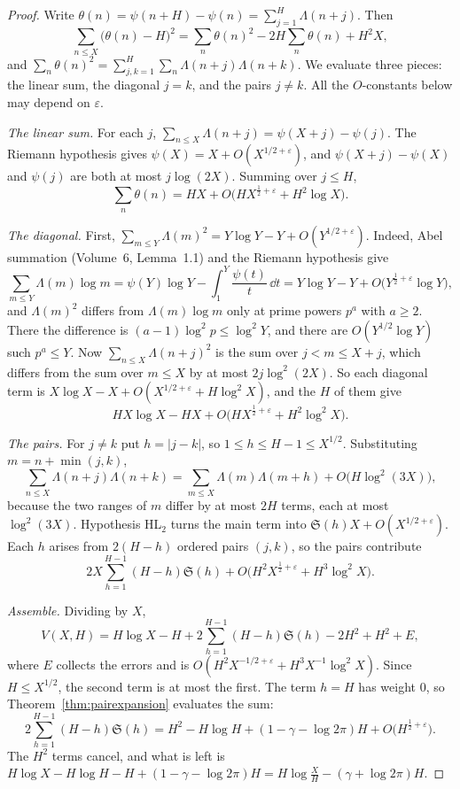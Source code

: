 \begin{proof}
Write $\theta(n)=\psi(n+H)-\psi(n)=\sum_{j=1}^H\Lambda(n+j)$. Then
\[
\sum_{n\le X}\bigl(\theta(n)-H\bigr)^2=\sum_n\theta(n)^2-2H\sum_n\theta(n)+H^2X,
\]
and $\sum_n\theta(n)^2=\sum_{j,k=1}^H\sum_n\Lambda(n+j)\Lambda(n+k)$. We evaluate three pieces: the linear sum, the diagonal $j=k$, and the pairs $j\ne k$. All the $O$-constants below may depend on $\varepsilon$.

\emph{The linear sum.} For each $j$, $\sum_{n\le X}\Lambda(n+j)=\psi(X+j)-\psi(j)$. The Riemann hypothesis gives $\psi(X)=X+O(X^{1/2+\varepsilon})$, and $\psi(X+j)-\psi(X)$ and $\psi(j)$ are both at most $j\log(2X)$. Summing over $j\le H$,
\[
\sum_n\theta(n)=HX+O\bigl(HX^{\frac12+\varepsilon}+H^2\log X\bigr).
\]

\emph{The diagonal.} First, $\sum_{m\le Y}\Lambda(m)^2=Y\log Y-Y+O(Y^{1/2+\varepsilon})$. Indeed, Abel summation (Volume~6, Lemma~1.1) and the Riemann hypothesis give
\[
\sum_{m\le Y}\Lambda(m)\log m=\psi(Y)\log Y-\int_1^Y\frac{\psi(t)}t\,\dd t=Y\log Y-Y+O\bigl(Y^{\frac12+\varepsilon}\log Y\bigr),
\]
and $\Lambda(m)^2$ differs from $\Lambda(m)\log m$ only at prime powers $p^a$ with $a\ge2$. There the difference is $(a-1)\log^2p\le\log^2Y$, and there are $O(Y^{1/2}\log Y)$ such $p^a\le Y$. Now $\sum_{n\le X}\Lambda(n+j)^2$ is the sum over $j<m\le X+j$, which differs from the sum over $m\le X$ by at most $2j\log^2(2X)$. So each diagonal term is $X\log X-X+O(X^{1/2+\varepsilon}+H\log^2X)$, and the $H$ of them give
\[
HX\log X-HX+O\bigl(HX^{\frac12+\varepsilon}+H^2\log^2X\bigr).
\]

\emph{The pairs.} For $j\ne k$ put $h=|j-k|$, so $1\le h\le H-1\le X^{1/2}$. Substituting $m=n+\min(j,k)$,
\[
\sum_{n\le X}\Lambda(n+j)\Lambda(n+k)=\sum_{m\le X}\Lambda(m)\Lambda(m+h)+O\bigl(H\log^2(3X)\bigr),
\]
because the two ranges of $m$ differ by at most $2H$ terms, each at most $\log^2(3X)$. Hypothesis HL$_2$ turns the main term into $\mathfrak S(h)X+O(X^{1/2+\varepsilon})$. Each $h$ arises from $2(H-h)$ ordered pairs $(j,k)$, so the pairs contribute
\[
2X\sum_{h=1}^{H-1}(H-h)\mathfrak S(h)+O\bigl(H^2X^{\frac12+\varepsilon}+H^3\log^2X\bigr).
\]

\emph{Assemble.} Dividing by $X$,
\[
V(X,H)=H\log X-H+2\sum_{h=1}^{H-1}(H-h)\mathfrak S(h)-2H^2+H^2+E,
\]
where $E$ collects the errors and is $O(H^2X^{-1/2+\varepsilon}+H^3X^{-1}\log^2X)$. Since $H\le X^{1/2}$, the second term is at most the first. The term $h=H$ has weight $0$, so Theorem~\ref{thm:pairexpansion} evaluates the sum:
\[
2\sum_{h=1}^{H-1}(H-h)\mathfrak S(h)=H^2-H\log H+(1-\gamma-\log2\pi)H+O\bigl(H^{\frac12+\varepsilon}\bigr).
\]
The $H^2$ terms cancel, and what is left is $H\log X-H\log H-H+(1-\gamma-\log2\pi)H=H\log\frac XH-(\gamma+\log2\pi)H$.
\end{proof}

